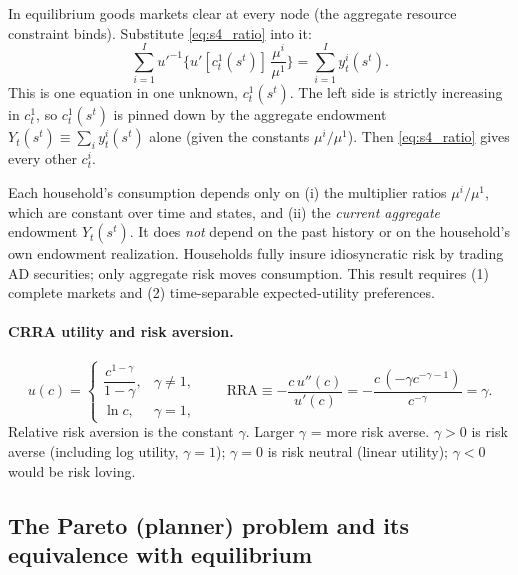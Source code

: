 In equilibrium goods markets clear at every node (the aggregate resource constraint binds). Substitute \eqref{eq:s4_ratio} into it:
\begin{equation}\label{eq:s4_agg}
  \sum_{i=1}^{I} u'^{-1}\Big\{u'[c^1_t(s^t)]\,\frac{\mu^i}{\mu^1}\Big\} = \sum_{i=1}^I y^i_t(s^t).
\end{equation}
This is one equation in one unknown, $c^1_t(s^t)$. The left side is strictly increasing in $c^1_t$, so $c^1_t(s^t)$ is pinned down by the aggregate endowment $Y_t(s^t)\equiv\sum_iy^i_t(s^t)$ alone (given the constants $\mu^i/\mu^1$). Then \eqref{eq:s4_ratio} gives every other $c^i_t$.

\begin{keybox}[title=Complete-markets allocation]
Each household's consumption depends only on (i) the multiplier ratios $\mu^i/\mu^1$, which are constant over time and states, and (ii) the \emph{current aggregate} endowment $Y_t(s^t)$. It does \emph{not} depend on the past history or on the household's own endowment realization. Households fully insure idiosyncratic risk by trading AD securities; only aggregate risk moves consumption.
This result requires (1) complete markets and (2) time-separable expected-utility preferences.
\end{keybox}

\paragraph{CRRA utility and risk aversion.}
\[
u(c)=\begin{cases}\dfrac{c^{1-\gamma}}{1-\gamma}, & \gamma\neq1,\\[6pt] \ln c, & \gamma=1,\end{cases}
\qquad
\text{RRA}\equiv-\frac{c\,u''(c)}{u'(c)}=-\frac{c\,(-\gamma c^{-\gamma-1})}{c^{-\gamma}}=\gamma .
\]
Relative risk aversion is the constant $\gamma$. Larger $\gamma$ = more risk averse. $\gamma>0$ is risk averse (including log utility, $\gamma=1$); $\gamma=0$ is risk neutral (linear utility); $\gamma<0$ would be risk loving.

\subsection{The Pareto (planner) problem and its equivalence with equilibrium }

